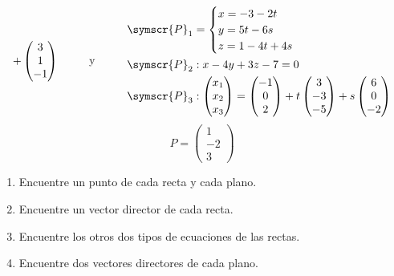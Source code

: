 \documentclass{article}
\def\fancyP{\symscr{P}}
\begin{document}
\begin{enumerate}
\[\begin{aligned}
            +
            \begin{pmatrix}3 \\ 1 \\ -1\end{pmatrix}
        \end{aligned}
        \hspace{1cm}
        \text{y}
        \hspace{1cm}
        \begin{aligned}
            \fancyP_1 &=
            \begin{cases}
                x = -3 -2t \\
                y = 5t - 6s \\ 
                z = 1 - 4t + 4s
            \end{cases} \\
            \fancyP_2 &:
            x - 4y + 3z - 7 = 0 \\ 
            \fancyP_3 &:
            \begin{pmatrix}x_1 \\ x_2 \\ x_3\end{pmatrix}
            =
            \begin{pmatrix}-1 \\ 0 \\ 2\end{pmatrix}
            + t\begin{pmatrix}3 \\ -3 \\ -5\end{pmatrix}
            + s\begin{pmatrix}6 \\ 0 \\ -2\end{pmatrix}
        \end{aligned}
    \]
    \[
        P = \begin{pmatrix}
            1 \\ -2 \\ 3
        \end{pmatrix}
    \]
    \begin{enumerate}[label=\listAlph]
		\item Encuentre un punto de cada recta y cada plano.
		\item Encuentre un vector director de cada recta.
		\item Encuentre los otros dos tipos de ecuaciones de las rectas.
		\item Encuentre dos vectores directores de cada plano.

\end{enumerate}
\end{enumerate}
\end{document}

